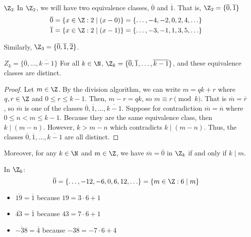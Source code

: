 \documentclass[letterpaper,12pt]{report}
\begin{document}
\begin{exbox}{$\Z_2$}{}
	In $\Z_2$, we will have two equivalence classes, $\overline{0}$ and $\overline{1}$. That is, $\Z_2 = \{\overline{0}, \overline{1}\}$
    \begin{align*}
        \overline{0} &= \{ x \in \Z : 2 \mid (x - 0) \} = \{ \ldots, -4, -2, 0, 2, 4, \ldots \} \\
        \overline{1} &= \{ x \in \Z : 2 \mid (x - 1) \} = \{ \ldots, -3, -1, 1, 3, 5, \ldots \}
    \end{align*}
\end{exbox}

Similarly, $\Z_3 = \{\overline{0}, \overline{1}, \overline{2}\}$.

\begin{thmbox}{$Z_k = \{\overline{0}, \ldots, \overline{k-1}\}$}{}
    For all $k \in \N$, $\Z_k = \{\overline{0}, \overline{1}, \ldots, \overline{k-1}\}$, and these equivalence classes are distinct.
    \tcblower
    \begin{proof}
        Let $m \in \Z$. By the division algorithm, we can write $m = qk + r$ where $q,r \in \Z$ and $0 \leq r \leq k-1$. Then, $m - r = qk$, so $m \equiv r \pmod{k}$. That is $\overline{m} = \overline{r}$, so $\overline{m}$ is one of the classes $\overline{0}, \overline{1}, \ldots, \overline{k-1}$. Suppose for contradiction $\overline{m} = \overline{n}$ where $0 \leq n < m \leq k-1$. Because they are the same equivalence class, then $k \mid (m - n)$. However, $k > m - n$ which contradicts $k \mid (m - n)$. Thus, the classes $\overline{0}, \overline{1}, \ldots, \overline{k-1}$ are all distinct.
    \end{proof}
\end{thmbox}

Moreover, for any $k \in \N$ and $m \in \Z$, we have $\overline{m} = \overline{0}$ in $\Z_k$ if and only if $k \mid m$.

\begin{exbox}{}{}
    In $\Z_6$:
    \[ \overline{0} = \{ \ldots, -12, -6, 0, 6, 12, \ldots\} = \{m \in \Z : 6 \mid m\} \]
    \begin{itemize}
        \item $\overline{19} = \overline{1}$ because $19 = 3 \cdot 6 +1 $
        \item $\overline{43} = \overline{1}$ because $43 = 7 \cdot 6 + 1$
        \item $\overline{-38} = \overline{4}$ because $-38 = -7 \cdot 6 + 4$
    \end{itemize}
\end{exbox}
\end{document}
